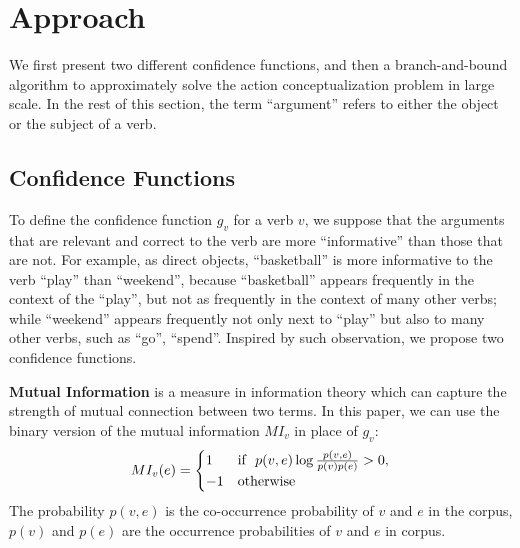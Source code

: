 \section{Approach}
\label{sec:algo}
We first present two different confidence functions, and then
a branch-and-bound algorithm to approximately solve the
action conceptualization problem in large scale.
In the rest of this section, the term ``argument'' refers to either
the object or the subject of a verb.

\subsection{Confidence Functions}
To define the confidence function $g_v$ for a verb $v$,
we suppose that the arguments that are relevant and correct to the verb
are more ``informative'' than those that are not.
For example, as direct objects, ``basketball'' is more informative to the verb
``play'' than ``weekend'',
because ``basketball'' appears frequently in the context of the ``play'', but
not as frequently in the context of many other verbs; while ``weekend''
appears frequently not only next to ``play'' but also to many other
verbs, such as ``go'', ``spend''.
Inspired by such observation, we propose two confidence functions.

\textbf{Mutual Information} is a measure in information theory which can
capture the strength of mutual connection between two terms.
In this paper, we can use the binary version of
the mutual information $MI_v$ in place of $g_v$:
\begin{equation}
MI_v(e)=
\begin{cases}
1 & \mbox{if}~\ p(v,e)\log \frac{p(v,e)}{p(v)p(e)}> 0,\\
-1 & \rm{otherwise}
\end{cases}
\end{equation}
The probability $p(v,e)$ is the co-occurrence probability
of $v$ and $e$ in the corpus, $p(v)$ and $p(e)$ are
the occurrence probabilities of $v$ and $e$ in corpus.

